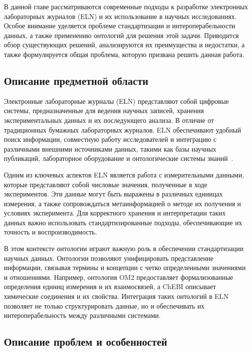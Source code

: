 \setcounter{section}{1}

В данной главе рассматриваются современные подходы к разработке электронных лабораторных журналов (ELN) и их использование в научных исследованиях. Особое внимание уделяется проблеме стандартизации и интероперабельности данных, а также применению онтологий для решения этой задачи. Приводится обзор существующих решений, анализируются их преимущества и недостатки, а также формулируется общая проблема, которую призвана решить данная работа.

\subsection{Описание предметной области}

Электронные лабораторные журналы (ELN) представляют собой цифровые системы, предназначенные для ведения научных записей, хранения экспериментальных данных и их последующего анализа. В отличие от традиционных бумажных лабораторных журналов, ELN обеспечивают удобный поиск информации, совместную работу исследователей и интеграцию с различными внешними источниками данных, такими как базы научных публикаций, лабораторное оборудование и онтологические системы знаний~\cite{ontology:base2}.

Одним из ключевых аспектов ELN является работа с измерительными данными, которые представляют собой числовые значения, полученные в ходе экспериментов. Эти данные могут быть выражены в различных единицах измерения, а также сопровождаться метаинформацией о методе их получения и условиях эксперимента. Для корректного хранения и интерпретации таких данных важно использовать стандартизированные подходы, обеспечивающие их точность и воспроизводимость.

В этом контексте онтологии играют важную роль в обеспечении стандартизации научных данных. Онтологии позволяют унифицировать представление информации, связывая термины и концепции с четко определенными значениями и отношениями. Например, онтология OM2 предоставляет формализованные определения единиц измерения и их взаимосвязей, а ChEBI описывает химические соединения и их свойства. Интеграция таких онтологий в ELN позволяет не только структурировать данные, но и обеспечивать их интероперабельность между различными системами.

\subsection{Описание проблем и особенностей}

